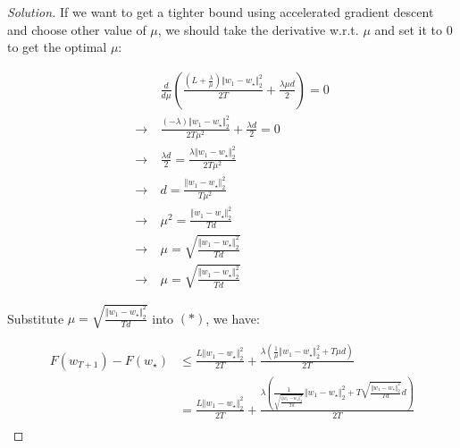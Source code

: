 \documentclass{article}
\newenvironment{solution}
  {\renewcommand\qedsymbol{$\blacksquare$}\begin{proof}[Solution]}
  {\end{proof}}
\begin{document}
\begin{solution}
If we want to get a tighter bound using accelerated gradient descent and choose other value of $\mu$, 
we should take the derivative w.r.t. $\mu$ and set it to $0$ to get the optimal $\mu$:

\begin{align*}
    &\frac{d}{d\mu} \left( \frac{\left(L + \frac{\lambda}{\mu}\right) \Vert w_1 - w_\star \Vert^2_2}{2T} + \frac{\lambda \mu d}{2} \right) = 0 \\
    \rightarrow \ & \frac{\left(-\lambda\right) \Vert w_1 - w_\star \Vert^2_2}{2T\mu^2} + \frac{\lambda d}{2} = 0 \\
    \rightarrow \ & \frac{\lambda d}{2} = \frac{\lambda \Vert w_1 - w_\star \Vert^2_2}{2T\mu^2} \\
    \rightarrow \ & d = \frac{\Vert w_1 - w_\star \Vert^2_2}{T\mu^2} \\
    \rightarrow \ & \mu^2 = \frac{\Vert w_1 - w_\star \Vert^2_2}{Td} \\
    \rightarrow \ & \mu = \sqrt{\frac{\Vert w_1 - w_\star \Vert^2_2}{Td}} \\
    \rightarrow \ & \mu = \sqrt{\frac{\Vert w_1 - w_\star \Vert^2_2}{Td}}
\end{align*}

Substitute $\mu = \sqrt{\frac{\Vert w_1 - w_\star \Vert^2_2}{Td}}$ into $(*)$, we have:

\begin{align*}
    F(w_{T+1}) - F(w_\star) 
    &\leq \frac{L \Vert w_1 - w_\star \Vert^2_2}{2T} + \frac{\lambda \left( \frac{1}{\mu} \Vert w_1 - w_\star \Vert^2_2 + T \mu d \right)}{2T} \\
    &= \frac{L \Vert w_1 - w_\star \Vert^2_2}{2T} + \frac{\lambda \left( \frac{1}{\sqrt{\frac{\Vert w_1 - w_\star \Vert^2_2}{Td}}} \Vert w_1 - w_\star \Vert^2_2 + T \sqrt{\frac{\Vert w_1 - w_\star \Vert^2_2}{Td}} d \right)}{2T} \\
\end{align*}

\end{solution}
\end{document}
